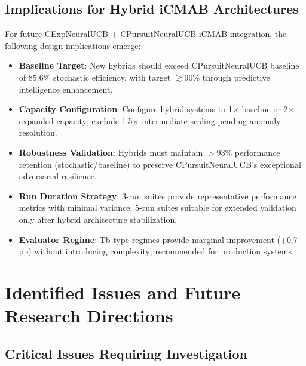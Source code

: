 \documentclass[12pt,a4paper]{article}
\begin{document}
\subsection{Implications for Hybrid iCMAB Architectures}

For future CExpNeuralUCB + CPursuitNeuralUCB-iCMAB integration, the following design implications emerge:

\begin{itemize}
\item \textbf{Baseline Target}: New hybrids should exceed CPursuitNeuralUCB baseline of 85.6\% stochastic efficiency, with target $\gtrsim$90\% through predictive intelligence enhancement.
\item \textbf{Capacity Configuration}: Configure hybrid systems to 1$\times$ baseline or 2$\times$ expanded capacity; exclude 1.5$\times$ intermediate scaling pending anomaly resolution.
\item \textbf{Robustness Validation}: Hybrids must maintain $>$93\% performance retention (stochastic/baseline) to preserve CPursuitNeuralUCB's exceptional adversarial resilience.
\item \textbf{Run Duration Strategy}: 3-run suites provide representative performance metrics with minimal variance; 5-run suites suitable for extended validation only after hybrid architecture stabilization.
\item \textbf{Evaluator Regime}: Tb-type regimes provide marginal improvement (+0.7 pp) without introducing complexity; recommended for production systems.
\end{itemize}

\section{Identified Issues and Future Research Directions}

\subsection{Critical Issues Requiring Investigation}
\end{document}
